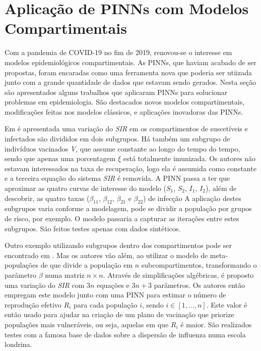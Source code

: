\section{Aplicação de PINNs com Modelos Compartimentais}

Com a pandemia de COVID-19 no fim de 2019, renovou-se o interesse em modelos
epidemiológicos compartimentais. As PINNs, que haviam acabado de ser propostas,
foram encaradas como uma ferramenta nova que poderia ser utiizada junto com 
a grande quantidade de dados que estavam sendo gerados. 
Nesta seção são apresentados alguns trabalhos que aplicaram PINNs para solucionar
problemas em epidemiologia. São destacados novos modelos compartimentais, 
modificações feitas nos modelos clássicos, e aplicações inovadoras das PINNs.  

Em \cite{ouyoussef-etal:24-subcompartimentos} é apresentada uma variação
do \textit{SIR} em os compartimentos de suscetíveis e infectados 
são divididos em dois subgrupos. Há também um subgrupo de indivíduos 
vacinados \textit{V}, que assume constante ao longo do tempo do tempo, 
sendo que apenas uma porcentagem $\xi$ está totalmente imunizada.
Os autores não estavam interessados na taxa de recuperação, logo ela é assumida
como constante e a terceira equação do sistema \textit{SIR} é removida. 
A PINN passa a ter que aproximar as quatro curvas de interesse do modelo 
($S_1$, $S_2$, $I_1$, $I_2$), 
além de descobrir, as quatro taxas 
($\beta_{11}$, $\beta_{12}$, $\beta_{21}$ e $\beta_{22}$) de infecção
A aplicação destes subgrupos varia conforme a modelagem, 
pode se dividir a população por grupos de risco, por exemplo.
O modelo passaria a capturar as iterações entre estes subgrupos.
São feitos testes apenas com dados sintéticos. 

Outro exemplo utilizando subgrupos dentro dos compartimentos pode ser encontrado
em \cite{arulandu-etal:23-vacinacao}. Mas os autores vão além, ao utilizar 
o modelo de meta-populações de \cite{jacquez:1988-modelagam-hiv-matriz} que 
divide a população em $n$ subcompartimentos, transformando o parâmetro $\beta$ 
numa matriz $n \times n$. Através de simplificações algébricas, é proposto uma 
variação do \textit{SIR} com $3n$ equações e $3n + 3$ parâmetros.
Os autores então empregam este modelo junto com uma PINN para estimar o número 
de reprodução efetivo $R_i$ para cada população $i$, sendo $i \in [1,...,n]$. 
Este valor é então usado para ajudar na criação de um plano de vacinação que 
priorize populações mais vulneráveis, ou seja, aquelas em que $R_i$ é maior.
São realizados testes com a famosa base de dados sobre a dispersão de influenza
numa escola londrina.  


